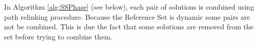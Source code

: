 

In Algorithm \ref{alg:SSPhase} (see below),
each pair of solutions
is combined using path relinking procedure.
Because
the Reference Set is dynamic
some pairs are not be combined.
This is due the fact
that some solutions
are removed from the set
before trying to combine them.

